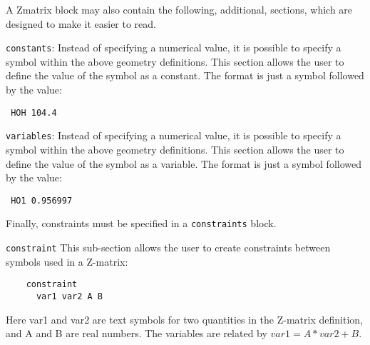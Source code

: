\documentclass[11pt]{article}
\begin{document}
\begin{description}
A Zmatrix block may also contain the following, additional, sections, which
are designed to make it easier to read.

\item \texttt{constants}: Instead of specifying a numerical value, it
  is possible to specify a symbol within the above geometry
  definitions. This section allows the user to define the value of the
  symbol as a constant. The format is just a symbol followed by the
  value:

\noindent\texttt{      HOH 104.4}

\item \texttt{variables}: Instead of specifying a numerical value, it
  is possible to specify a symbol within the above geometry
  definitions. This section allows the user to define the value of the
  symbol as a variable. The format is just a symbol followed by the
  value:

\noindent\texttt{      HO1 0.956997}

Finally, constraints must be specified in a \texttt{constraints} block.

\item \texttt{constraint} This sub-section allows the user to create
  constraints between symbols used in a Z-matrix:
\begin{verbatim}
    constraint
      var1 var2 A B
\end{verbatim}
Here var1 and var2 are text symbols for two quantities in the Z-matrix
definition, and A and B are real numbers. The variables are related by
$var1 = A*var2 + B$.


\end{description}
\end{document}
